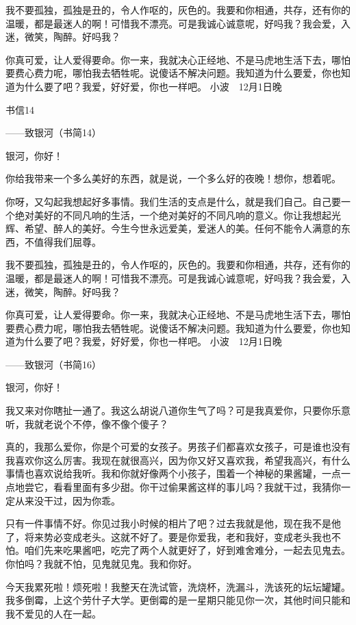 我不要孤独，孤独是丑的，令人作呕的，灰色的。我要和你相通，共存，还有你的温暖，都是最迷人的啊！可惜我不漂亮。可是我诚心诚意呢，好吗我？我会爱，入迷，微笑，陶醉。好吗我？ 

你真可爱，让人爱得要命。你一来，我就决心正经地、不是马虎地生活下去，哪怕要费心费力呢，哪怕我去牺牲呢。说傻话不解决问题。我知道为什么要爱，你也知道为什么要了吧？我爱，好好爱，你也一样吧。 小波　12月1日晚 



书信14 

——致银河（书简14） 

银河，你好！ 

你给我带来一个多么美好的东西，就是说，一个多么好的夜晚！想你，想着呢。 

你呀，又勾起我想起好多事情。我们生活的支点是什么，就是我们自己。自己要一个绝对美好的不同凡响的生活，一个绝对美好的不同凡响的意义。你让我想起光辉、希望、醉人的美好。今生今世永远爱美，爱迷人的美。任何不能令人满意的东西，不值得我们屈尊。 

我不要孤独，孤独是丑的，令人作呕的，灰色的。我要和你相通，共存，还有你的温暖，都是最迷人的啊！可惜我不漂亮。可是我诚心诚意呢，好吗我？我会爱，入迷，微笑，陶醉。好吗我？ 

你真可爱，让人爱得要命。你一来，我就决心正经地、不是马虎地生活下去，哪怕要费心费力呢，哪怕我去牺牲呢。说傻话不解决问题。我知道为什么要爱，你也知道为什么要了吧？我爱，好好爱，你也一样吧。 小波　12月1日晚 







——致银河（书简16） 

银河，你好！ 

我又来对你瞎扯一通了。我这么胡说八道你生气了吗？可是我真爱你，只要你乐意听，我就老说个不停，像不像个傻子？ 

真的，我那么爱你，你是个可爱的女孩子。男孩子们都喜欢女孩子，可是谁也没有我喜欢你这么厉害。我现在就很高兴，因为你又好又喜欢我，希望我高兴，有什么事情也喜欢说给我听。我和你就好像两个小孩子，围着一个神秘的果酱罐，一点一点地尝它，看看里面有多少甜。你干过偷果酱这样的事儿吗？我就干过，我猜你一定从来没干过，因为你乖。 

只有一件事情不好。你见过我小时候的相片了吧？过去我就是他，现在我不是他了，将来势必变成老头。这就不好了。要是你爱我，老和我好，变成老头我也不怕。咱们先来吃果酱吧，吃完了两个人就更好了，好到难舍难分，一起去见鬼去。你怕吗？我就不怕，见鬼就见鬼。我和你好。 

今天我累死啦！烦死啦！我整天在洗试管，洗烧杯，洗漏斗，洗该死的坛坛罐罐。我多倒霉，上这个劳什子大学。更倒霉的是一星期只能见你一次，其他时间只能和我不爱见的人在一起。 

